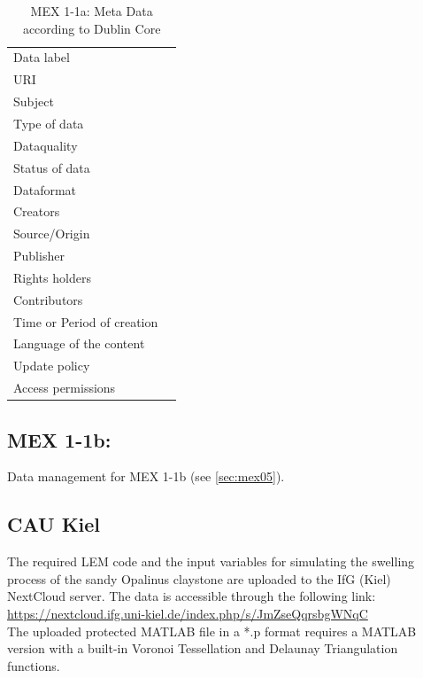 \begin{table}[!ht]
\caption{MEX 1-1a: Meta Data according to Dublin Core}
\label{tab:dms-mex1-1a}
\small
\begin{tabular}{R{3cm}|L{7cm}}
\hline
%
Data label &  \\
URI &  \\
Subject  &  \\
Type of data  &  \\
Dataquality  &  \\
Status of data  &  \\
Dataformat  & \\
Creators  &  \\
Source/Origin &  \\
Publisher  &  \\
Rights holders &  \\
Contributors &  \\
Time or Period of creation &  \\
Language of the content &  \\
Update policy &  \\
Access permissions &  \\
%
\hline
\end{tabular}
\end{table}

\subsection{MEX 1-1b:}

Data management for MEX 1-1b (see \ref{sec:mex05}).

\subsection*{CAU Kiel}
The required LEM code and the input variables for simulating the swelling process of the sandy Opalinus claystone are uploaded to the IfG (Kiel) NextCloud server. The data is accessible through the following link:\\
\hyperlink{https://nextcloud.ifg.uni-kiel.de/index.php/s/JmZseQqrsbgWNqC}{https://nextcloud.ifg.uni-kiel.de/index.php/s/JmZseQqrsbgWNqC}\\

The uploaded protected MATLAB file in a *.p format requires a MATLAB version with a built-in Voronoi Tessellation and Delaunay Triangulation functions.


